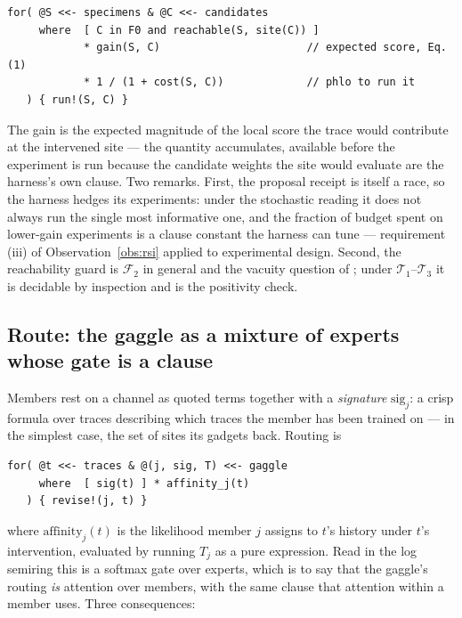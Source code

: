 \documentclass[11pt]{article}
\theoremstyle{plain}
\theoremstyle{definition}
\theoremstyle{remark}
\begin{document}
\begin{lstlisting}
for( @S <<- specimens & @C <<- candidates
     where  [ C in F0 and reachable(S, site(C)) ]
            * gain(S, C)                       // expected score, Eq. (1)
            * 1 / (1 + cost(S, C))             // phlo to run it
   ) { run!(S, C) }
\end{lstlisting}

The gain is the expected magnitude of the local score the trace would
contribute at the intervened site --- the quantity \cite[Cor.~5.7]{GradedPLN}
accumulates, available before the experiment is run because the candidate
weights the site would evaluate are the harness's own clause. Two remarks.
First, the proposal receipt is itself a race, so the harness hedges its
experiments: under the stochastic reading it does not always run the single
most informative one, and the fraction of budget spent on lower-gain
experiments is a clause constant the harness can tune --- requirement (iii) of
Observation~\ref{obs:rsi} applied to experimental design. Second, the
reachability guard is $\mathcal{F}_2$ in general and the vacuity question of
\cite[\S7.1]{Interventions}; under $\mathcal{T}_1$--$\mathcal{T}_3$ it is
decidable by inspection and is the positivity check.

\subsection{Route: the gaggle as a mixture of experts whose gate is a clause}
\label{ssec:route}

Members rest on a channel as quoted terms together with a \emph{signature}
$\mathrm{sig}_j$: a crisp formula over traces describing which traces the
member has been trained on --- in the simplest case, the set of sites its
gadgets back. Routing is

\begin{lstlisting}
for( @t <<- traces & @(j, sig, T) <<- gaggle
     where  [ sig(t) ] * affinity_j(t)
   ) { revise!(j, t) }
\end{lstlisting}

where $\mathrm{affinity}_j(t)$ is the likelihood member $j$ assigns to $t$'s
history under $t$'s intervention, evaluated by running $T_j$ as a pure
expression. Read in the log semiring this is a softmax gate over experts, which
is to say that the gaggle's routing \emph{is} attention over members, with the
same clause that attention within a member uses. Three consequences:
\end{document}
